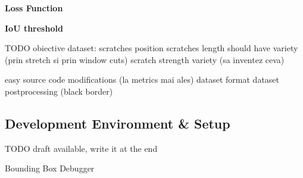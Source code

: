 \textbf{Loss Function}


\textbf{IoU threshold}


TODO obiective dataset:
scratches position
scratches length should have variety (prin stretch si prin window cuts)
scratch strength variety (sa inventez ceva)

easy source code modifications (la metrics mai ales)
dataset format
dataset postprocessing (black border)



\subsection{Development Environment \& Setup}
TODO draft available, write it at the end

Bounding Box Debugger
